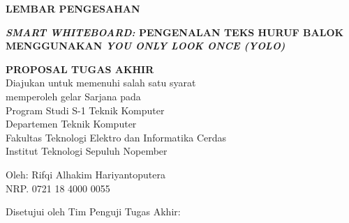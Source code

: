 \begin{center}
	\large
  \textbf{LEMBAR PENGESAHAN}
\end{center}

\thispagestyle{empty}

\begin{center}
  \textbf{\emph{SMART WHITEBOARD:} PENGENALAN TEKS HURUF BALOK MENGGUNAKAN \emph{YOU ONLY LOOK ONCE (YOLO)}}
\end{center}

\begingroup
  \small
  
  \vspace{3ex}

  \begin{center}
    \textbf{PROPOSAL TUGAS AKHIR}
    \\Diajukan untuk memenuhi salah satu syarat
    \\memperoleh gelar Sarjana pada
    \\Program Studi S-1 Teknik Komputer
    \\Departemen Teknik Komputer
    \\Fakultas Teknologi Elektro dan Informatika Cerdas
    \\Institut Teknologi Sepuluh Nopember
  \end{center}

  \vspace{3ex}

  \begin{center}
    Oleh: Rifqi Alhakim Hariyantoputera 
    \\NRP. 0721 18 4000 0055
  \end{center}

  \vspace{3ex}


  \begin{center}
    Disetujui oleh Tim Penguji Tugas Akhir:
  \end{center}

  \vspace{4ex}

